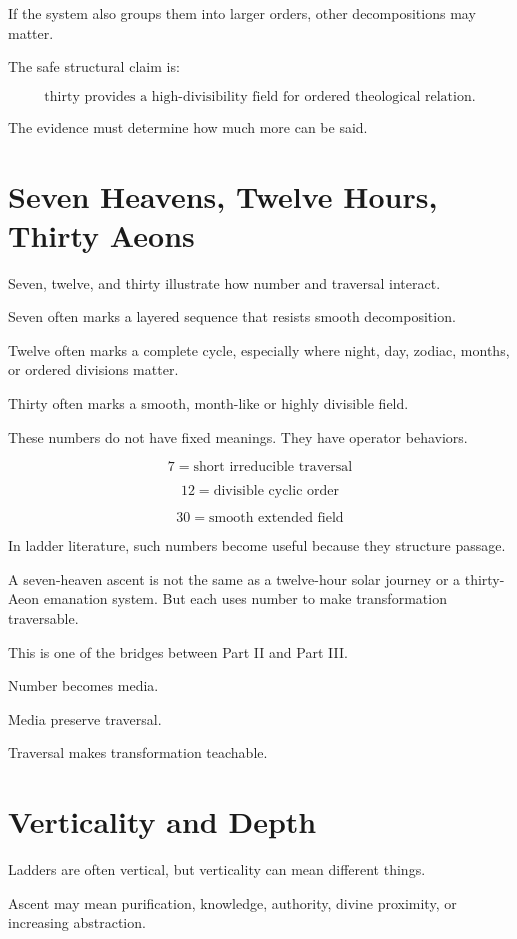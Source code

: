 \documentclass[11pt]{book}
\begin{document}
If the system also groups them into larger orders, other decompositions may matter.

The safe structural claim is:

\[
\text{thirty provides a high-divisibility field for ordered theological relation}.
\]

The evidence must determine how much more can be said.

\section{Seven Heavens, Twelve Hours, Thirty Aeons}

Seven, twelve, and thirty illustrate how number and traversal interact.

Seven often marks a layered sequence that resists smooth decomposition.

Twelve often marks a complete cycle, especially where night, day, zodiac, months, or ordered divisions matter.

Thirty often marks a smooth, month-like or highly divisible field.

These numbers do not have fixed meanings. They have operator behaviors.

\[
7 = \text{short irreducible traversal}
\]

\[
12 = \text{divisible cyclic order}
\]

\[
30 = \text{smooth extended field}
\]

In ladder literature, such numbers become useful because they structure passage.

A seven-heaven ascent is not the same as a twelve-hour solar journey or a thirty-Aeon emanation system. But each uses number to make transformation traversable.

This is one of the bridges between Part II and Part III.

Number becomes media.

Media preserve traversal.

Traversal makes transformation teachable.

\section{Verticality and Depth}

Ladders are often vertical, but verticality can mean different things.

Ascent may mean purification, knowledge, authority, divine proximity, or increasing abstraction.
\end{document}
